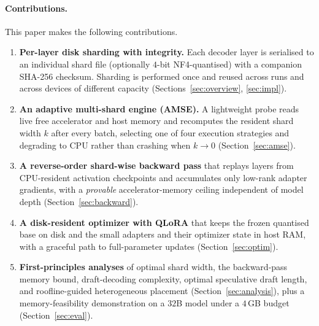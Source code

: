 \documentclass{article}
\begin{document}
\paragraph{Contributions.} This paper makes the following contributions.
\begin{enumerate}
  \item \textbf{Per-layer disk sharding with integrity.} Each decoder layer is
  serialised to an individual shard file (optionally $4$-bit NF4-quantised) with
  a companion SHA-256 checksum. Sharding is performed once and reused across runs
  and across devices of different capacity (Sections~\ref{sec:overview},
  \ref{sec:impl}).

  \item \textbf{An adaptive multi-shard engine (AMSE).} A lightweight probe reads
  live free accelerator and host memory and recomputes the resident shard width
  $k$ after every batch, selecting one of four execution strategies and
  degrading to CPU rather than crashing when $k\!\to\!0$
  (Section~\ref{sec:amse}).

  \item \textbf{A reverse-order shard-wise backward pass} that replays layers
  from CPU-resident activation checkpoints and accumulates only low-rank adapter
  gradients, with a \emph{provable} accelerator-memory ceiling independent of
  model depth (Section~\ref{sec:backward}).

  \item \textbf{A disk-resident optimizer with QLoRA} that keeps the frozen
  quantised base on disk and the small adapters and their optimizer state in host
  RAM, with a graceful path to full-parameter updates
  (Section~\ref{sec:optim}).

  \item \textbf{First-principles analyses} of optimal shard width, the
  backward-pass memory bound, draft-decoding complexity, optimal speculative
  draft length, and roofline-guided heterogeneous placement
  (Section~\ref{sec:analysis}), plus a memory-feasibility demonstration on a
  $32$B model under a $4$\,GB budget (Section~\ref{sec:eval}).
\end{enumerate}
\end{document}
